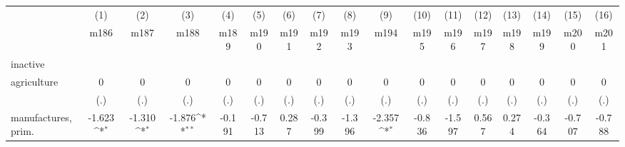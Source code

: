 {
\def\sym#1{\ifmmode^{#1}\else\(^{#1}\)\fi}
\begin{tabular}{l*{16}{c}}
\hline\hline
                    &\multicolumn{1}{c}{(1)}&\multicolumn{1}{c}{(2)}&\multicolumn{1}{c}{(3)}&\multicolumn{1}{c}{(4)}&\multicolumn{1}{c}{(5)}&\multicolumn{1}{c}{(6)}&\multicolumn{1}{c}{(7)}&\multicolumn{1}{c}{(8)}&\multicolumn{1}{c}{(9)}&\multicolumn{1}{c}{(10)}&\multicolumn{1}{c}{(11)}&\multicolumn{1}{c}{(12)}&\multicolumn{1}{c}{(13)}&\multicolumn{1}{c}{(14)}&\multicolumn{1}{c}{(15)}&\multicolumn{1}{c}{(16)}\\
                    &\multicolumn{1}{c}{m186}&\multicolumn{1}{c}{m187}&\multicolumn{1}{c}{m188}&\multicolumn{1}{c}{m189}&\multicolumn{1}{c}{m190}&\multicolumn{1}{c}{m191}&\multicolumn{1}{c}{m192}&\multicolumn{1}{c}{m193}&\multicolumn{1}{c}{m194}&\multicolumn{1}{c}{m195}&\multicolumn{1}{c}{m196}&\multicolumn{1}{c}{m197}&\multicolumn{1}{c}{m198}&\multicolumn{1}{c}{m199}&\multicolumn{1}{c}{m200}&\multicolumn{1}{c}{m201}\\
\hline
inactive            &                     &                     &                     &                     &                     &                     &                     &                     &                     &                     &                     &                     &                     &                     &                     &                     \\
agriculture         &           0         &           0         &           0         &           0         &           0         &           0         &           0         &           0         &           0         &           0         &           0         &           0         &           0         &           0         &           0         &           0         \\
                    &         (.)         &         (.)         &         (.)         &         (.)         &         (.)         &         (.)         &         (.)         &         (.)         &         (.)         &         (.)         &         (.)         &         (.)         &         (.)         &         (.)         &         (.)         &         (.)         \\
[1em]
manufactures, prim. &      -1.623\sym{*}  &      -1.310\sym{*}  &      -1.876\sym{**} &      -0.191         &      -0.713         &       0.287         &      -0.399         &      -1.396         &      -2.357\sym{*}  &      -0.836         &      -1.597         &       0.567         &       0.274         &      -0.364         &      -0.707         &      -0.788         \\

\end{tabular}}
